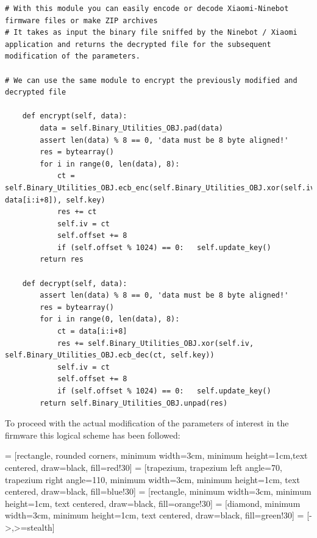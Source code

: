 \documentclass[binding=0.6cm,LaM,noexaminfo]{sapthesis}
\begin{document}
\begin{lstlisting}[language=iPython, label=dec_enc, firstnumber=26]
# With this module you can easily encode or decode Xiaomi-Ninebot firmware files or make ZIP archives
# It takes as input the binary file sniffed by the Ninebot / Xiaomi application and returns the decrypted file for the subsequent modification of the parameters.

# We can use the same module to encrypt the previously modified and decrypted file

	def encrypt(self, data):
		data = self.Binary_Utilities_OBJ.pad(data)
		assert len(data) % 8 == 0, 'data must be 8 byte aligned!'
		res = bytearray()
		for i in range(0, len(data), 8):
			ct = self.Binary_Utilities_OBJ.ecb_enc(self.Binary_Utilities_OBJ.xor(self.iv, data[i:i+8]), self.key)
			res += ct
			self.iv = ct
			self.offset += 8
			if (self.offset % 1024) == 0:	self.update_key()
		return res

    def decrypt(self, data):
    	assert len(data) % 8 == 0, 'data must be 8 byte aligned!'
    	res = bytearray()
    	for i in range(0, len(data), 8):
    		ct = data[i:i+8]
    		res += self.Binary_Utilities_OBJ.xor(self.iv, self.Binary_Utilities_OBJ.ecb_dec(ct, self.key))
    		self.iv = ct
    		self.offset += 8
    		if (self.offset % 1024) == 0:	self.update_key()
    	return self.Binary_Utilities_OBJ.unpad(res)
\end{lstlisting}

\newpage
\noindent To proceed with the actual modification of the parameters of interest in the firmware this logical scheme has been followed:

 = [rectangle, rounded corners, minimum width=3cm, minimum height=1cm,text centered, draw=black, fill=red!30]
 = [trapezium, trapezium left angle=70, trapezium right angle=110, minimum width=3cm, minimum height=1cm, text centered, draw=black, fill=blue!30]
 = [rectangle, minimum width=3cm, minimum height=1cm, text centered, draw=black, fill=orange!30]
 = [diamond, minimum width=3cm, minimum height=1cm, text centered, draw=black, fill=green!30]
 = [->,>=stealth]
\end{document}
